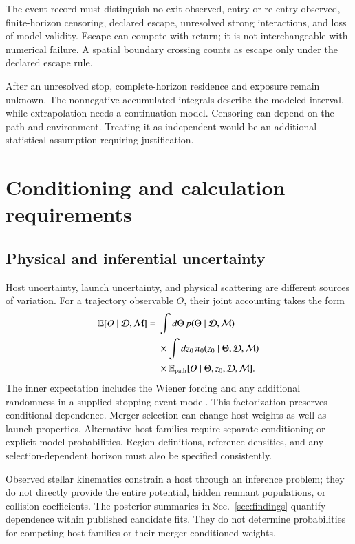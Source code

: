 \documentclass[aps,prd,reprint,amsmath,amssymb,superscriptaddress,nofootinbib,longbibliography,floatfix]{revtex4-2}
\begin{document}
The event record must distinguish no exit observed, entry or re-entry observed, finite-horizon censoring, declared escape, unresolved strong interactions, and loss of model validity. Escape can compete with return; it is not interchangeable with numerical failure. A spatial boundary crossing counts as escape only under the declared escape rule.

After an unresolved stop, complete-horizon residence and exposure remain unknown. The nonnegative accumulated integrals describe the modeled interval, while extrapolation needs a continuation model. Censoring can depend on the path and environment. Treating it as independent would be an additional statistical assumption requiring justification.

\section{Conditioning and calculation requirements}\label{sec:requirements}

\subsection{Physical and inferential uncertainty}

Host uncertainty, launch uncertainty, and physical scattering are different sources of variation. For a trajectory observable $O$, their joint accounting takes the form
\begin{align}
\mathbb E[O\mid\mathcal D,\mathcal M]
={}&\int d\Theta\,p(\Theta\mid\mathcal D,\mathcal M)\nonumber\\
&\times\int dz_0\,\pi_0(z_0\mid\Theta,\mathcal D,\mathcal M)
\nonumber\\
&\times\mathbb E_{\rm path}
[O\mid\Theta,z_0,\mathcal D,\mathcal M].
\label{eq:uncertainty}
\end{align}
The inner expectation includes the Wiener forcing and any additional randomness in a supplied stopping-event model. This factorization preserves conditional dependence. Merger selection can change host weights as well as launch properties. Alternative host families require separate conditioning or explicit model probabilities. Region definitions, reference densities, and any selection-dependent horizon must also be specified consistently.

Observed stellar kinematics constrain a host through an inference problem; they do not directly provide the entire potential, hidden remnant populations, or collision coefficients. The posterior summaries in Sec.~\ref{sec:findings} quantify dependence within published candidate fits. They do not determine probabilities for competing host families or their merger-conditioned weights.
\end{document}

